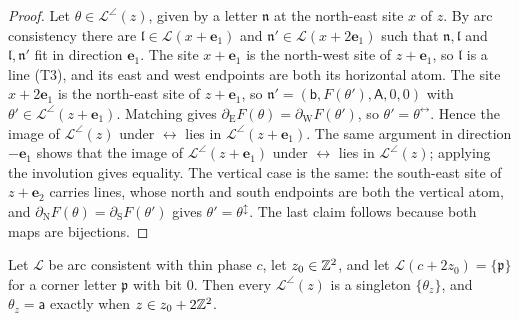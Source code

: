 \begin{proof}
Let $\theta\in\mathcal L^{\angle}(z)$, given by a letter $\mathfrak n$ at the north-east site $x$ of $z$. By arc consistency there are $\mathfrak l\in\mathcal L(x+\mathbf e_1)$ and $\mathfrak n'\in\mathcal L(x+2\mathbf e_1)$ such that $\mathfrak n,\mathfrak l$ and $\mathfrak l,\mathfrak n'$ fit in direction $\mathbf e_1$. The site $x+\mathbf e_1$ is the north-west site of $z+\mathbf e_1$, so $\mathfrak l$ is a line (T3), and its east and west endpoints are both its horizontal atom. The site $x+2\mathbf e_1$ is the north-east site of $z+\mathbf e_1$, so $\mathfrak n'=(\mathsf b,F(\theta'),\mathsf A,0,0)$ with $\theta'\in\mathcal L^{\angle}(z+\mathbf e_1)$. Matching gives $\partial_{\mathrm E}F(\theta)=\partial_{\mathrm W}F(\theta')$, so $\theta'=\theta^{\leftrightarrow}$. Hence the image of $\mathcal L^{\angle}(z)$ under ${\leftrightarrow}$ lies in $\mathcal L^{\angle}(z+\mathbf e_1)$. The same argument in direction $-\mathbf e_1$ shows that the image of $\mathcal L^{\angle}(z+\mathbf e_1)$ under ${\leftrightarrow}$ lies in $\mathcal L^{\angle}(z)$; applying the involution gives equality. The vertical case is the same: the south-east site of $z+\mathbf e_2$ carries lines, whose north and south endpoints are both the vertical atom, and $\partial_{\mathrm N}F(\theta)=\partial_{\mathrm S}F(\theta')$ gives $\theta'=\theta^{\updownarrow}$. The last claim follows because both maps are bijections.
\end{proof}

\begin{lemma}\label{thr:zero}
Let $\mathcal L$ be arc consistent with thin phase $c$, let $z_0\in\mathbb{Z}^2$, and let $\mathcal L(c+2z_0)=\{\mathfrak p\}$ for a corner letter $\mathfrak p$ with bit $0$. Then every $\mathcal L^{\angle}(z)$ is a singleton $\{\theta_z\}$, and $\theta_z=\mathsf a$ exactly when $z\in z_0+2\mathbb{Z}^2$.
\end{lemma}

